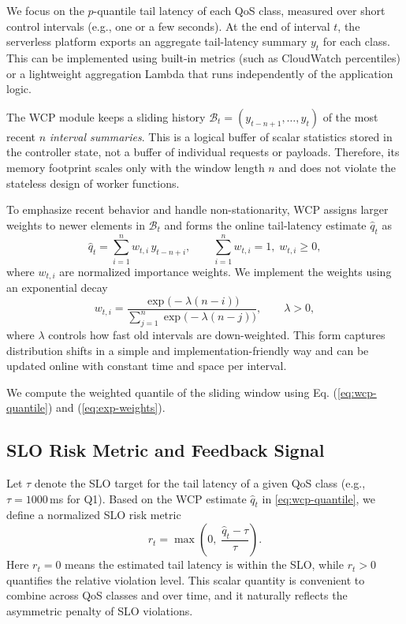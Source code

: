 \documentclass[journal]{IEEEtran}
\begin{document}
We focus on the $p$-quantile tail latency of each QoS class, measured
over short control intervals (e.g., one or a few seconds). At the end
of interval $t$, the serverless platform exports an aggregate
tail-latency summary $y_t$ for each class. This can be implemented
using built-in metrics (such as CloudWatch percentiles) or a
lightweight aggregation Lambda that runs independently of the
application logic.

The WCP module keeps a sliding history
\(
\mathcal{B}_t = (y_{t-n+1}, \dots, y_t)
\)
of the most recent $n$ \emph{interval summaries}. This is a logical
buffer of scalar statistics stored in the controller state, not a
buffer of individual requests or payloads. Therefore, its memory
footprint scales only with the window length $n$ and does not violate
the stateless design of worker functions.

To emphasize recent behavior and handle non-stationarity, WCP assigns
larger weights to newer elements in $\mathcal{B}_t$ and forms the
online tail-latency estimate $\hat{q}_t$ as
\begin{equation}
  \hat{q}_t = \sum_{i=1}^{n} w_{t,i}\, y_{t-n+i},
  \qquad
  \sum_{i=1}^{n} w_{t,i} = 1,\; w_{t,i} \ge 0,
  \label{eq:wcp-quantile}
\end{equation}
where $w_{t,i}$ are normalized importance weights. We implement the
weights using an exponential decay
\begin{equation}
  w_{t,i}
  = \frac{\exp\bigl(-\lambda (n-i)\bigr)}
         {\sum_{j=1}^{n} \exp\bigl(-\lambda (n-j)\bigr)},
  \qquad \lambda > 0,
  \label{eq:exp-weights}
\end{equation}
where $\lambda$ controls how fast old intervals are down-weighted.
This form captures distribution shifts in a simple and
implementation-friendly way and can be updated online with constant
time and space per interval.

We compute the weighted quantile of the sliding window using Eq. (\ref{eq:wcp-quantile}) and (\ref{eq:exp-weights}).

\subsection{SLO Risk Metric and Feedback Signal}
\label{subsec:slo-risk-feedback}

Let $\tau$ denote the SLO target for the tail latency of a given QoS
class (e.g., $\tau = 1000\,$ms for Q1). Based on the WCP estimate
$\hat{q}_t$ in \eqref{eq:wcp-quantile}, we define a normalized SLO
risk metric
\begin{equation}
  r_t = \max\!\left(0,\;
        \frac{\hat{q}_t - \tau}{\tau}\right).
  \label{eq:slo-risk}
\end{equation}
Here $r_t = 0$ means the estimated tail latency is within the SLO,
while $r_t > 0$ quantifies the relative violation level. This scalar
quantity is convenient to combine across QoS classes and over time,
and it naturally reflects the asymmetric penalty of SLO violations.
\end{document}
